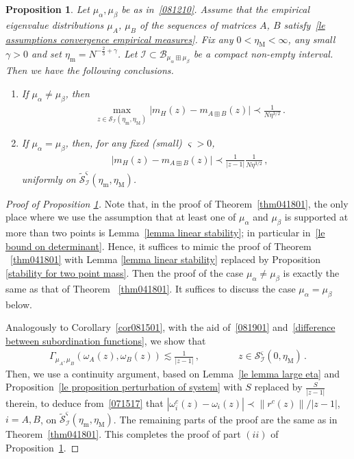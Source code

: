 \documentclass[10pt,reqno]{amsart}
\numberwithin{equation}{section}
\theoremstyle{plain}
\newtheorem{proposition}[theorem]{Proposition}
\numberwithin{kevin}{section}
\theoremstyle{remark}
\begin{document}
\begin{proposition} \label{pro.a.1}
Let $\mu_\alpha,\mu_\beta$ be as in~\eqref{081210}. Assume that the empirical eigenvalue distributions $\mu_A$, $\mu_B$ of the sequences of matrices $A$, $B$ satisfy~\eqref{le assumptions convergence empirical measures}. Fix any $0<\eta_{\mathrm{M}}<\infty$, any small $\gamma>0$ and set $\eta_\mathrm{m}=N^{-\frac23+\gamma}$. Let $\mathcal{I}\subset\mathcal{B}_{\mu_\alpha\boxplus\mu_\beta}$ be a compact non-empty interval. Then we have the following conclusions.
\begin{enumerate}
\item[$(i)$] If $\mu_{\alpha}\neq \mu_{\beta}$, then
\begin{align*}
&\max_{z\in\mathcal{S}_{\mathcal{I}}(\eta_\mathrm{m},\eta_{\mathrm{M}})}\big|m_H(z)-m_{A\boxplus B}(z)\big|\prec  \frac{1}{N\eta^{3/2}}\,.
\end{align*}
\item[$(ii)$] If $\mu_{\alpha}=\mu_{\beta}$, then, for any fixed (small) $\varsigma>0$, 
\begin{align*}
&\big|m_H(z)-m_{A\boxplus B}(z)\big|\prec \frac{1}{|z-1|}\frac{1}{N\eta^{3/2}} \,,
\end{align*}
uniformly on $\widetilde{\mathcal{S}}_{\mathcal{I}}^\varsigma(\eta_\mathrm{m},\eta_{\mathrm{M}})$.
\end{enumerate}
\end{proposition}

\begin{proof}[Proof of Proposition \ref{pro.a.1}] Note that, in the proof of Theorem~\ref{thm041801}, the only place where we use the assumption that at least one of $\mu_{\alpha}$ and $\mu_{\beta}$ is supported at more than two points is Lemma~\ref{lemma linear stability}; in particular in~\eqref{le bound on determinant}.  Hence, it suffices to mimic the proof of Theorem ~\ref{thm041801} with Lemma \ref{lemma linear stability} replaced by Proposition \ref{stability for two point mass}. Then the proof of the case  $\mu_\alpha\neq \mu_\beta$ is exactly the same as that of Theorem ~\ref{thm041801}. It suffices to discuss the case  $\mu_\alpha= \mu_\beta$ below.  


Analogously to Corollary~\ref{cor081501}, with the aid of~\eqref{081901} and~\eqref{difference between subordination functions}, we show that
\begin{align}\label{081902}
 \Gamma_{\mu_A,\mu_B}(\omega_A(z),\omega_B(z))\lesssim\frac{1}{|z-1|}\,,\qquad\qquad z\in\mathcal{S}_{\mathcal{I}}^\varsigma(0,\eta_{\mathrm{M}})\,.
\end{align}
Then, we use a continuity argument, based on Lemma~\ref{le lemma large eta} and Proposition~\ref{le proposition perturbation of system} with $S$ replaced by $\frac{S}{|z-1|}$ therein, to deduce from~\eqref{071517} that $|\omega_i^c(z)-\omega_i(z)|\prec \|r^c(z)\|/|z-1|$, $i=A,B$, on $\widetilde{\mathcal{S}}_{\mathcal{I}}^\varsigma(\eta_{\mathrm{m}},\eta_{\mathrm{M}})$. The remaining parts of the proof are the same as in Theorem~\ref{thm041801}. This completes the proof of part $(ii)$ of Proposition~\ref{pro.a.1}.\qedhere

\end{proof}
\end{document}
